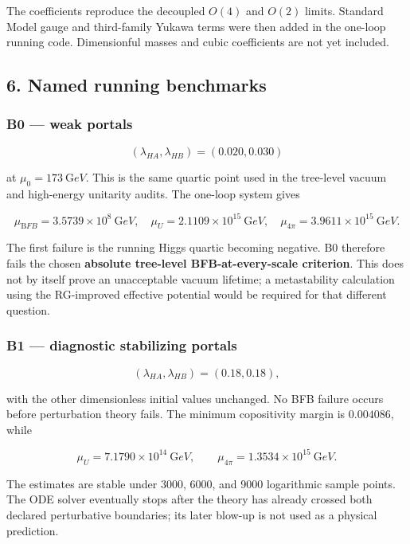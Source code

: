 \documentclass[
]{article}
\begin{document}
The coefficients reproduce the decoupled \(O(4)\) and \(O(2)\) limits.
Standard Model gauge and third-family Yukawa terms were then added in
the one-loop running code. Dimensionful masses and cubic coefficients
are not yet included.

\hypertarget{named-running-benchmarks}{%
\subsection{6. Named running
benchmarks}\label{named-running-benchmarks}}

\hypertarget{b0-weak-portals}{%
\subsubsection{B0 --- weak portals}\label{b0-weak-portals}}

\[
(\lambda_{HA},\lambda_{HB})=(0.020,0.030)
\]

at \(\mu_0=173\ {\mathrm GeV}\). This is the same quartic point used in
the tree-level vacuum and high-energy unitarity audits. The one-loop
system gives

\[
\mu_{\mathrm BFB}=3.5739\times10^8\ {\mathrm GeV},\quad
\mu_U=2.1109\times10^{15}\ {\mathrm GeV},\quad
\mu_{4\pi}=3.9611\times10^{15}\ {\mathrm GeV}.
\]

The first failure is the running Higgs quartic becoming negative. B0
therefore fails the chosen \textbf{absolute tree-level
BFB-at-every-scale criterion}. This does not by itself prove an
unacceptable vacuum lifetime; a metastability calculation using the
RG-improved effective potential would be required for that different
question.

\hypertarget{b1-diagnostic-stabilizing-portals}{%
\subsubsection{B1 --- diagnostic stabilizing
portals}\label{b1-diagnostic-stabilizing-portals}}

\[
(\lambda_{HA},\lambda_{HB})=(0.18,0.18),
\]

with the other dimensionless initial values unchanged. No BFB failure
occurs before perturbation theory fails. The minimum copositivity margin
is \(0.004086\), while

\[
\mu_U=7.1790\times10^{14}\ {\mathrm GeV},\qquad
\mu_{4\pi}=1.3534\times10^{15}\ {\mathrm GeV}.
\]

The estimates are stable under 3000, 6000, and 9000 logarithmic sample
points. The ODE solver eventually stops after the theory has already
crossed both declared perturbative boundaries; its later blow-up is not
used as a physical prediction.
\end{document}
